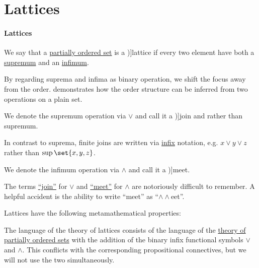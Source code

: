 \section{Lattices}\label{sec:lattices}

\paragraph{Lattices}

\begin{definition}\label{def:lattice}
  We say that a \hyperref[def:partially_ordered_set]{partially ordered set} is a \term[ru=решётка (\cite[def. 4.2]{Гуров2013ТеорияРешёток})]{lattice} if every two element have both a \hyperref[def:extremal_points/supremum_and_infimum]{supremum} and an \hyperref[def:extremal_points/supremum_and_infimum]{infimum}.

  By regarding suprema and infima as binary operation, we shift the focus away from the order.  demonstrates how the order structure can be inferred from two operations on a plain set.

  \begin{thmenum}[series=def:lattice]
     We denote the supremum operation via \( \vee \) and call it a \term[ru=объединение (\cite[def. 4.2]{Гуров2013ТеорияРешёток})]{join} and rather than supremum.

    In contrast to suprema, finite joins are written via \hyperref[def:function_application_syntax]{infix} notation, e.g. \( x \vee y \vee z \) rather than \( \sup\set{ x, y, z } \).

     We denote the infimum operation via \( \wedge \) and call it a \term[ru=сечение (\cite[def. 4.2]{Гуров2013ТеорияРешёток})]{meet}.
  \end{thmenum}

  The terms \hyperref[def:lattice/join]{\enquote{join}} for \( \vee \) and \hyperref[def:lattice/meet]{\enquote{meet}} for \( \wedge \) are notoriously difficult to remember. A helpful accident is the ability to write \enquote{meet} as \enquote{\( \wedge \wedge \)eet}.

  Lattices have the following metamathematical properties:
  \begin{thmenum}[resume=def:lattice]
    \mimprovised The language of the theory of lattices consists of the language of the \hyperref[def:partially_ordered_set]{theory of partially ordered sets} with the addition of the binary infix functional symbols \( \vee \) and \( \wedge \). This conflicts with the corresponding propositional connectives, but we will not use the two simultaneously.


\end{thmenum}
\end{definition}
